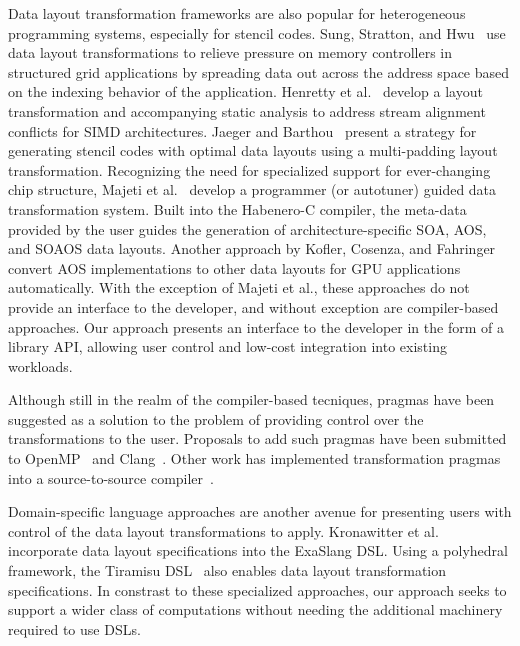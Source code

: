 \documentclass[sigconf,review=true]{acmart}
\begin{document}
Data layout transformation frameworks are also popular for heterogeneous programming systems, especially for stencil codes.
Sung, Stratton, and Hwu~\cite{sung2010data} use data layout transformations to relieve pressure on memory controllers in structured grid applications by spreading data out across the address space based on the indexing behavior of the application.
Henretty et al.~\cite{henretty2011data} develop a layout transformation and accompanying static analysis to address stream alignment conflicts for SIMD architectures.
Jaeger and Barthou~\cite{jaeger2012automatic} present a strategy for generating stencil codes with optimal data layouts using a multi-padding layout transformation.
Recognizing the need for specialized support for ever-changing chip structure, Majeti et al.~\cite{majeti2013compiler} develop a programmer (or autotuner) guided data transformation system.
Built into the Habenero-C compiler, the meta-data provided by the user guides the generation of architecture-specific SOA, AOS, and SOAOS data layouts.
Another approach by Kofler, Cosenza, and Fahringer~\cite{kofler2015automatic} convert AOS implementations to other data layouts for GPU applications automatically.  
With the exception of Majeti et al., these approaches do not provide an interface to the developer, and without exception are compiler-based approaches.
Our approach presents an interface to the developer in the form of a library API, allowing user control and low-cost integration into existing workloads.

Although still in the realm of the compiler-based tecniques, pragmas have been suggested as a solution to the problem of providing control over the transformations to the user.
Proposals to add such pragmas have been submitted to OpenMP~\cite{kruse2019design} and Clang~\cite{kruse2018user}.
Other work has implemented transformation pragmas into a source-to-source compiler~\cite{xu2014semi}. 


Domain-specific language approaches are another avenue for presenting users with control of the data layout transformations to apply. 
Kronawitter et al.~\cite{kronawitter2018automatic} incorporate data layout specifications into the ExaSlang DSL.
Using a polyhedral framework, the Tiramisu DSL~\cite{baghdadi2019tiramisu} also enables data layout transformation specifications.
In constrast to these specialized approaches, our approach seeks to support a wider class of computations without needing the additional machinery required to use DSLs. 
\end{document}
